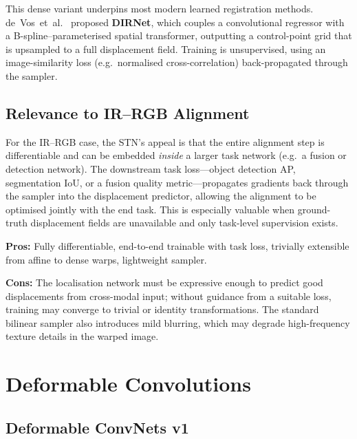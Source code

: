 This dense variant underpins most modern learned registration methods.
de~Vos~et~al.~\cite{devos2017dirnet} proposed \textbf{DIRNet}, which
couples a convolutional regressor with a B-spline--parameterised spatial
transformer, outputting a control-point grid that is upsampled to a full
displacement field.  Training is unsupervised, using an image-similarity
loss (e.g.\ normalised cross-correlation) back-propagated through the
sampler.

\subsection{Relevance to IR--RGB Alignment}

For the IR--RGB case, the STN's appeal is that the entire alignment step
is differentiable and can be embedded \emph{inside} a larger
task network (e.g.\ a fusion or detection network).  The downstream task
loss---object detection AP, segmentation IoU, or a fusion quality
metric---propagates gradients back through the sampler into the
displacement predictor, allowing the alignment to be optimised jointly
with the end task.  This is especially valuable when ground-truth
displacement fields are unavailable and only task-level supervision
exists.

\noindent\textbf{Pros:} Fully differentiable, end-to-end trainable with
task loss, trivially extensible from affine to dense warps, lightweight
sampler.

\noindent\textbf{Cons:} The localisation network must be expressive
enough to predict good displacements from cross-modal input; without
guidance from a suitable loss, training may converge to trivial or
identity transformations.  The standard bilinear sampler also introduces
mild blurring, which may degrade high-frequency texture details in the
warped image.


\section{Deformable Convolutions}
\label{sec:dcn}

\subsection{Deformable ConvNets v1}

